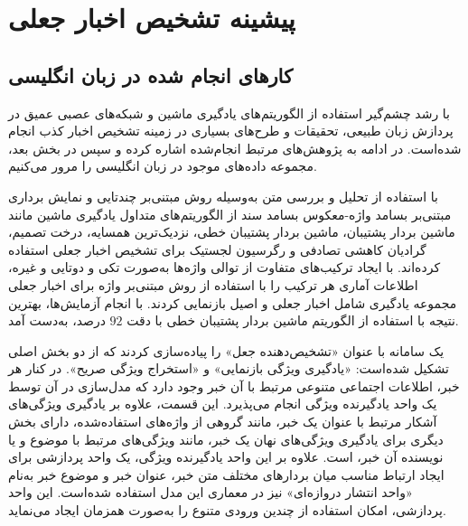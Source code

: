 \chapter{پیشینه تشخیص اخبار جعلی}
\section{کارهای انجام شده در زبان انگلیسی}
با رشد چشم‌گیر استفاده از الگوریتم‌های یادگیری ماشین و شبکه‌های عصبی عمیق در پردازش زبان طبیعی، تحقیقات و طرح‌های بسیاری در زمینه تشخیص اخبار کذب انجام شده‌است. در ادامه به پژوهش‌های مرتبط انجام‌شده اشاره کرده و سپس در بخش بعد، مجموعه داده‌های موجود در زبان انگلیسی را مرور می‌کنیم.

\citet{ahmed2017detection} با استفاده از تحلیل و بررسی متن به‌وسیله روش مبتنی‌بر چندتایی و نمایش برداری مبتنی‌بر بسامد واژه-معکوس بسامد سند از الگوریتم‌های متداول یادگیری ماشین مانند ماشین بردار پشتیبان، ماشین بردار پشتیبان خطی، نزدیک‌ترین همسایه، درخت تصمیم، گرادیان کاهشی تصادفی و رگرسیون لجستیک برای تشخیص اخبار جعلی استفاده کرده‌اند. با ایجاد ترکیب‌های متفاوت از توالی واژه‌ها به‌صورت تکی و دوتایی و غیره، اطلاعات آماری هر ترکیب را با استفاده از روش مبتنی‌بر واژه برای اخبار جعلی مجموعه یادگیری شامل اخبار جعلی و اصیل بازنمایی کردند. با انجام آزمایش‌ها، بهترین نتیجه با استفاده از الگوریتم ماشین بردار پشتیبان خطی با دقت $92$ درصد، به‌دست آمد.

\citet{zhang2020fakedetector} یک سامانه با عنوان «تشخیص‌دهنده جعل» را پیاده‌سازی  کردند که از دو بخش اصلی تشکیل شده‌است: «یادگیری ویژگی بازنمایی»   و «استخراج ویژگی صریح». در کنار هر خبر، اطلاعات اجتماعی متنوعی مرتبط با آن خبر وجود دارد که مدل‌سازی در آن توسط یک واحد یادگیرنده ویژگی انجام می‌پذیرد. این قسمت، علاوه بر یادگیری ویژگی‌های آشکار مرتبط با  عنوان یک خبر، مانند گروهی از واژه‌های استفاده‌شده، دارای بخش دیگری برای یادگیری ویژگی‌های نهان یک خبر، مانند ویژگی‌های مرتبط با موضوع و یا نویسنده آن خبر، است. علاوه بر این واحد یادگیرنده ویژگی، یک واحد پردازشی برای ایجاد ارتباط مناسب میان بردارهای مختلف متن خبر، عنوان خبر و موضوع خبر به‌نام «واحد انتشار دروازه‌ای» نیز در معماری این مدل استفاده شده‌است. این واحد پردازشی، امکان استفاده از چندین ورودی متنوع را به‌صورت همزمان ایجاد می‌نماید.

